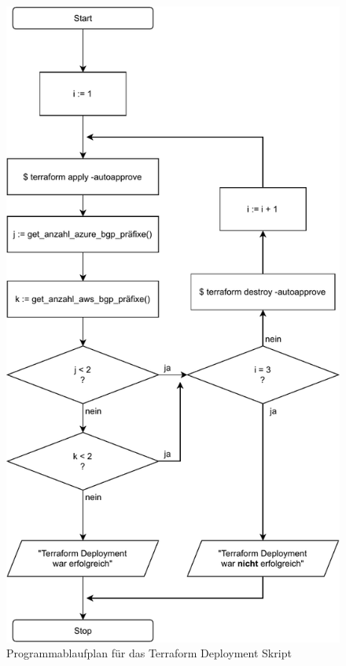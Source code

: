 \begin{figure}[h]
  \centering
  \includegraphics[scale=0.6]{Figures/programmablaufplan_bash_deploy_tf.pdf}
  \caption{Programmablaufplan für das Terraform Deployment Skript}
  \label{grafik:programmablaufplan_bash_deploy_tf}
\end{figure}\FloatBarrier

